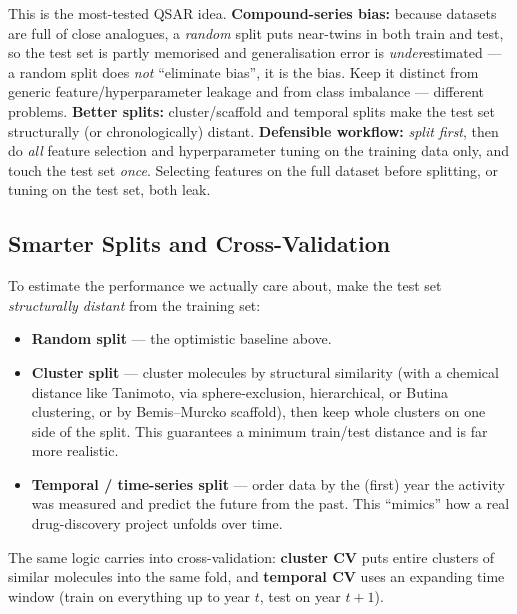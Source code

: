 \documentclass[11pt, oneside]{book}
\begin{document}
\begin{starbox}[title={Exam-critical: honest splits and the defensible workflow}]
This is the most-tested QSAR idea. \textbf{Compound-series bias:} because datasets
are full of close analogues, a \emph{random} split puts near-twins in both train
and test, so the test set is partly memorised and generalisation error is
\emph{under}estimated --- a random split does \emph{not} ``eliminate bias'', it is
the bias. Keep it distinct from generic feature/hyperparameter leakage and from
class imbalance --- different problems. \textbf{Better splits:} cluster/scaffold
and temporal splits make the test set structurally (or chronologically) distant.
\textbf{Defensible workflow:} \emph{split first}, then do \emph{all} feature
selection and hyperparameter tuning on the training data only, and touch the test
set \emph{once}. Selecting features on the full dataset before splitting, or tuning
on the test set, both leak.
\end{starbox}

\subsection{Smarter Splits and Cross-Validation}

To estimate the performance we actually care about, make the test set
\emph{structurally distant} from the training set:

\begin{itemize}
  \item \textbf{Random split} --- the optimistic baseline above.
  \item \textbf{Cluster split} --- cluster molecules by structural similarity (with
        a chemical distance like Tanimoto, via sphere-exclusion, hierarchical, or
        Butina clustering, or by Bemis--Murcko scaffold), then keep whole clusters
        on one side of the split. This guarantees a minimum train/test distance and
        is far more realistic.
  \item \textbf{Temporal / time-series split} --- order data by the (first) year
        the activity was measured and predict the future from the past. This
        ``mimics'' how a real drug-discovery project unfolds over time.
\end{itemize}

The same logic carries into cross-validation: \textbf{cluster CV} puts entire
clusters of similar molecules into the same fold, and \textbf{temporal CV} uses an
expanding time window (train on everything up to year $t$, test on year $t{+}1$).
\end{document}
